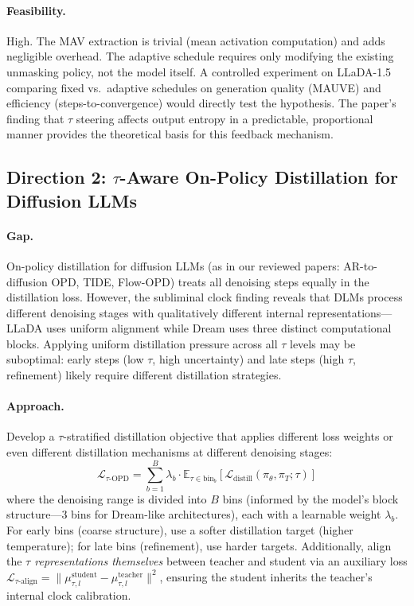 \documentclass[11pt,a4paper]{article}
\begin{document}
\paragraph{Feasibility.}
High. The MAV extraction is trivial (mean activation computation) and adds negligible overhead. The adaptive schedule requires only modifying the existing unmasking policy, not the model itself. A controlled experiment on LLaDA-1.5 comparing fixed vs.\ adaptive schedules on generation quality (MAUVE) and efficiency (steps-to-convergence) would directly test the hypothesis. The paper's finding that $\tau$ steering affects output entropy in a predictable, proportional manner provides the theoretical basis for this feedback mechanism.

\subsection{Direction 2: $\tau$-Aware On-Policy Distillation for Diffusion LLMs}

\paragraph{Gap.}
On-policy distillation for diffusion LLMs (as in our reviewed papers: AR-to-diffusion OPD, TIDE, Flow-OPD) treats all denoising steps equally in the distillation loss. However, the subliminal clock finding reveals that DLMs process different denoising stages with qualitatively different internal representations---LLaDA uses uniform alignment while Dream uses three distinct computational blocks. Applying uniform distillation pressure across all $\tau$ levels may be suboptimal: early steps (low $\tau$, high uncertainty) and late steps (high $\tau$, refinement) likely require different distillation strategies.

\paragraph{Approach.}
Develop a $\tau$-stratified distillation objective that applies different loss weights or even different distillation mechanisms at different denoising stages:
\begin{equation}
    \mathcal{L}_{\tau\text{-OPD}} = \sum_{b=1}^{B} \lambda_b \cdot \mathbb{E}_{\tau \in \text{bin}_b}\left[\mathcal{L}_{\text{distill}}(\pi_\theta, \pi_T; \tau)\right]
\end{equation}
where the denoising range is divided into $B$ bins (informed by the model's block structure---3 bins for Dream-like architectures), each with a learnable weight $\lambda_b$. For early bins (coarse structure), use a softer distillation target (higher temperature); for late bins (refinement), use harder targets. Additionally, align the \emph{$\tau$ representations themselves} between teacher and student via an auxiliary loss $\mathcal{L}_{\tau\text{-align}} = \|\mu_{\tau,l}^{\text{student}} - \mu_{\tau,l}^{\text{teacher}}\|^2$, ensuring the student inherits the teacher's internal clock calibration.
\end{document}

